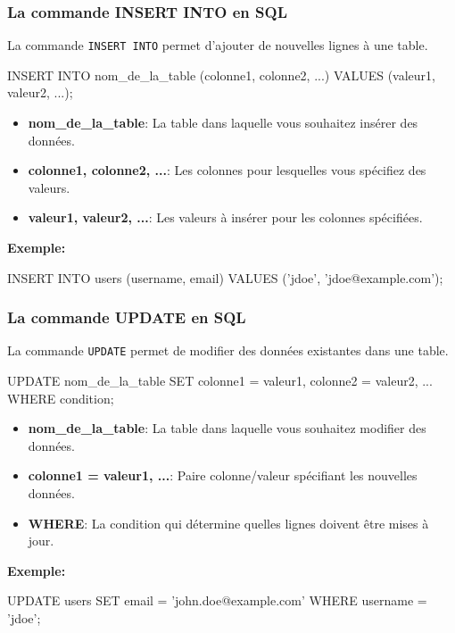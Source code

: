 \begin{frame}[fragile]
  \frametitle{La commande INSERT INTO en SQL}

  La commande \texttt{INSERT INTO} permet d'ajouter de nouvelles lignes à une table.

  \begin{semiverbatim}
INSERT INTO nom\_de\_la\_table (colonne1, colonne2, ...)
VALUES (valeur1, valeur2, ...);
  \end{semiverbatim}

  \begin{itemize}
    \item \textbf{nom\_de\_la\_table}: La table dans laquelle vous souhaitez insérer des données.
    \item \textbf{colonne1, colonne2, ...}: Les colonnes pour lesquelles vous spécifiez des valeurs.
    \item \textbf{valeur1, valeur2, ...}: Les valeurs à insérer pour les colonnes spécifiées.
  \end{itemize}

  \textbf{Exemple:}
  \begin{semiverbatim}
INSERT INTO users (username, email)
VALUES ('jdoe', 'jdoe@example.com');
  \end{semiverbatim}

\end{frame}

\begin{frame}[fragile]
  \frametitle{La commande UPDATE en SQL}

  La commande \texttt{UPDATE} permet de modifier des données existantes dans une table.

  \begin{semiverbatim}
UPDATE nom\_de\_la\_table
SET colonne1 = valeur1, colonne2 = valeur2, ...
WHERE condition;
  \end{semiverbatim}

  \begin{itemize}
    \item \textbf{nom\_de\_la\_table}: La table dans laquelle vous souhaitez modifier des données.
    \item \textbf{colonne1 = valeur1, ...}: Paire colonne/valeur spécifiant les nouvelles données.
    \item \textbf{WHERE}: La condition qui détermine quelles lignes doivent être mises à jour.
  \end{itemize}

  \textbf{Exemple:}
  \begin{semiverbatim}
UPDATE users
SET email = 'john.doe@example.com'
WHERE username = 'jdoe';
  \end{semiverbatim}

\end{frame}

